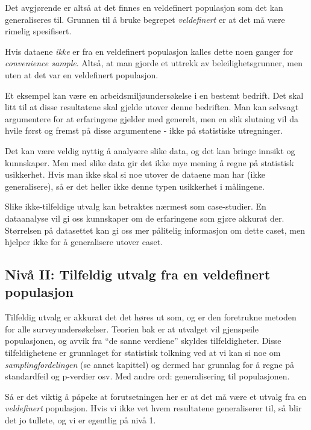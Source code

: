 \documentclass[
  letterpaper,
  DIV=11,
  numbers=noendperiod]{scrreprt}
\theoremstyle{definition}
\theoremstyle{remark}
\begin{document}
Det avgjørende er altså at det finnes en veldefinert populasjon som det
kan generaliseres til. Grunnen til å bruke begrepet \emph{veldefinert}
er at det må være rimelig spesifisert.

Hvis dataene \emph{ikke} er fra en veldefinert populasjon kalles dette
noen ganger for \emph{convenience sample}. Altså, at man gjorde et
uttrekk av beleilighetsgrunner, men uten at det var en veldefinert
populasjon.

Et eksempel kan være en arbeidsmiljøundersøkelse i en bestemt bedrift.
Det skal litt til at disse resultatene skal gjelde utover denne
bedriften. Man kan selvsagt argumentere for at erfaringene gjelder med
generelt, men en slik slutning vil da hvile først og fremst på disse
argumentene - ikke på statistiske utregninger.

Det kan være veldig nyttig å analysere slike data, og det kan bringe
innsikt og kunnskaper. Men med slike data gir det ikke mye mening å
regne på statistisk usikkerhet. Hvis man ikke skal si noe utover de
dataene man har (ikke generalisere), så er det heller ikke denne typen
usikkerhet i målingene.

Slike ikke-tilfeldige utvalg kan betraktes nærmest som case-studier. En
dataanalyse vil gi oss kunnskaper om de erfaringene som gjøre akkurat
der. Størrelsen på datasettet kan gi oss mer pålitelig informasjon om
dette caset, men hjelper ikke for å generalisere utover caset.

\hypertarget{nivuxe5-ii-tilfeldig-utvalg-fra-en-veldefinert-populasjon}{%
\subsection{Nivå II: Tilfeldig utvalg fra en veldefinert
populasjon}\label{nivuxe5-ii-tilfeldig-utvalg-fra-en-veldefinert-populasjon}}

Tilfeldig utvalg er akkurat det det høres ut som, og er den foretrukne
metoden for alle surveyundersøkelser. Teorien bak er at utvalget vil
gjenspeile populasjonen, og avvik fra ``de sanne verdiene'' skyldes
tilfeldigheter. Disse tilfeldighetene er grunnlaget for statistisk
tolkning ved at vi kan si noe om \emph{samplingfordelingen} (se annet
kapittel) og dermed har grunnlag for å regne på standardfeil og
p-verdier osv. Med andre ord: generalisering til populasjonen.

Så er det viktig å påpeke at forutsetningen her er at det må være et
utvalg fra en \emph{veldefinert} populasjon. Hvis vi ikke vet hvem
resultatene generaliserer til, så blir det jo tullete, og vi er egentlig
på nivå 1.
\end{document}
